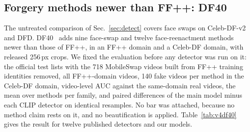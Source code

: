 
\subsection{Forgery methods newer than FF++: DF40}
\label{sec:df40}
The untreated comparison of Sec.~\ref{sec:detect} covers face swaps on Celeb-DF-v2 and DFD. DF40~\cite{df40} adds
nine face-swap and twelve face-reenactment methods newer than those of FF++, in an FF++ domain and a Celeb-DF domain,
with released 256\,px crops. We fixed the evaluation before any detector was run on it: the official test lists with
the 718 MobileSwap videos built from FF++ training identities removed, all FF++-domain videos, 140 fake videos per method
in the Celeb-DF domain, video-level AUC against the same-domain real videos, the mean over methods per family, and
paired differences of the main model minus each CLIP detector on identical resamples. No bar was attached, because
no method claim rests on it, and no beautification is applied. Table~\ref{tab:v4df40} gives the result for twelve
published detectors and our models.

